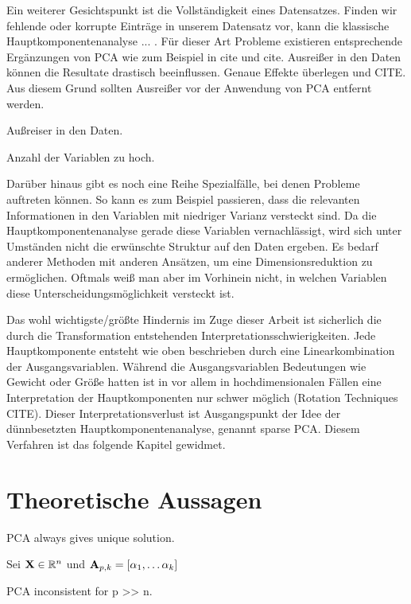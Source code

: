 Ein weiterer Gesichtspunkt ist die Vollständigkeit eines Datensatzes. Finden wir fehlende oder korrupte Einträge in unserem Datensatz vor, kann die klassische Hauptkomponentenanalyse ... . Für dieser Art Probleme existieren entsprechende Ergänzungen von PCA wie zum Beispiel in cite und cite. Ausreißer in den Daten können die Resultate drastisch beeinflussen. Genaue Effekte überlegen und CITE. Aus diesem Grund sollten Ausreißer vor der Anwendung von PCA entfernt werden.

Außreiser in den Daten.

Anzahl der Variablen zu hoch.

Darüber hinaus gibt es noch eine Reihe Spezialfälle, bei denen Probleme auftreten können. So kann es zum Beispiel passieren, dass die relevanten Informationen in den Variablen mit niedriger Varianz versteckt sind. Da die Hauptkomponentenanalyse gerade diese Variablen vernachlässigt, wird sich unter Umständen nicht die erwünschte Struktur auf den Daten ergeben. Es bedarf anderer Methoden mit anderen Ansätzen, um eine Dimensionsreduktion zu ermöglichen. Oftmals weiß man aber im Vorhinein nicht, in welchen Variablen diese Unterscheidungsmöglichkeit versteckt ist.

Das wohl wichtigste/größte Hindernis im Zuge dieser Arbeit ist sicherlich die durch die Transformation entstehenden Interpretationsschwierigkeiten. Jede Hauptkomponente entsteht wie oben beschrieben durch eine Linearkombination der Ausgangsvariablen. Während die Ausgangsvariablen Bedeutungen wie Gewicht oder Größe hatten ist in vor allem in hochdimensionalen Fällen eine Interpretation der Hauptkomponenten nur schwer möglich (Rotation Techniques CITE). Dieser Interpretationsverlust ist Ausgangspunkt der Idee der dünnbesetzten Hauptkomponentenanalyse, genannt sparse PCA. Diesem Verfahren ist das folgende Kapitel gewidmet.


\section{Theoretische Aussagen}

\begin{thm}
PCA always gives unique solution.
\end{thm}

\begin{thm}
Sei $\mathbf{X} \in \mathbb{R}^n$ und $\mathbf{A}_{p,k} = [\alpha_1, \ldots \alpha_k] $   
\end{thm}

\begin{thm}
PCA inconsistent for p >> n.
\end{thm}

